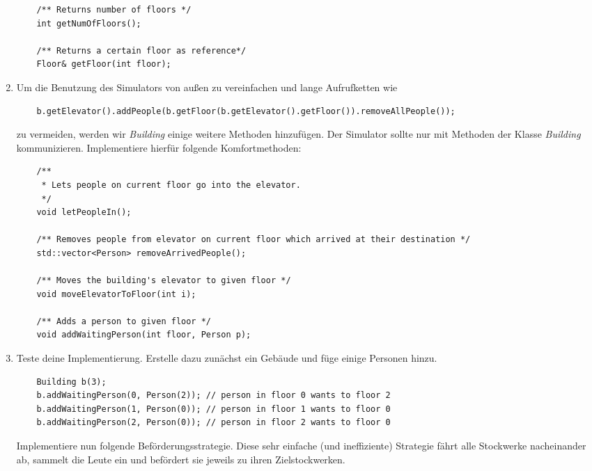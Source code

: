 \begin{enumerate}
\begin{lstlisting}
	/** Returns number of floors */
	int getNumOfFloors();
	
	/** Returns a certain floor as reference*/
	Floor& getFloor(int floor);
\end{lstlisting}


\item 
Um die Benutzung des Simulators von außen zu vereinfachen und lange Aufrufketten wie
\begin{lstlisting}
	b.getElevator().addPeople(b.getFloor(b.getElevator().getFloor()).removeAllPeople());
\end{lstlisting} 

zu vermeiden, werden wir \emph{Building} einige weitere Methoden hinzufügen.
Der Simulator sollte nur mit Methoden der Klasse \emph{Building} kommunizieren.
Implementiere hierfür folgende Komfortmethoden:

\begin{lstlisting}
	/** 
	 * Lets people on current floor go into the elevator.
	 */
	void letPeopleIn();
	
	/** Removes people from elevator on current floor which arrived at their destination */
	std::vector<Person> removeArrivedPeople();
	
	/** Moves the building's elevator to given floor */
	void moveElevatorToFloor(int i);
	
	/** Adds a person to given floor */
	void addWaitingPerson(int floor, Person p);
\end{lstlisting}	

\item
Teste deine Implementierung.
Erstelle dazu zunächst ein Gebäude und füge einige Personen hinzu.

\begin{lstlisting}
	Building b(3);
	b.addWaitingPerson(0, Person(2)); // person in floor 0 wants to floor 2
	b.addWaitingPerson(1, Person(0)); // person in floor 1 wants to floor 0
	b.addWaitingPerson(2, Person(0)); // person in floor 2 wants to floor 0
\end{lstlisting}

Implementiere nun folgende Beförderungsstrategie.
Diese sehr einfache (und ineffiziente) Strategie fährt alle Stockwerke nacheinander ab, sammelt die Leute ein und befördert sie jeweils zu ihren Zielstockwerken.

\begin{algorithm}[H]
 \SetAlgoLined
\end{algorithm}
\end{enumerate}
